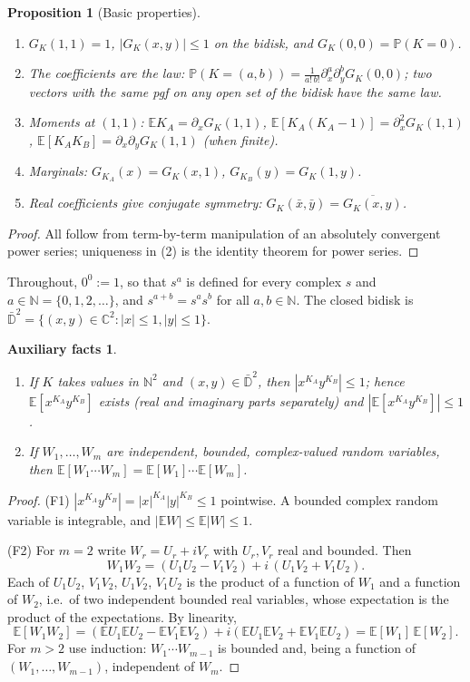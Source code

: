 \documentclass[11pt]{article}
\newtheorem{proposition}[theorem]{Proposition}
\newtheorem*{auxfacts}{Auxiliary facts}
\theoremstyle{definition}
\theoremstyle{remark}
\newcommand{\E}{\mathbb{E}}
\newcommand{\Prob}{\mathbb{P}}
\begin{document}
\begin{proposition}[Basic properties]\label{prop:pgfbasic}
\begin{enumerate}
\item $G_K(1,1)=1$, $|G_K(x,y)|\le1$ on the bidisk, and $G_K(0,0)=\Prob(K=0)$.
\item The coefficients are the law: $\Prob(K=(a,b))=\frac{1}{a!\,b!}\partial_x^a\partial_y^bG_K(0,0)$; two vectors with the same pgf on any open set of the bidisk have the same law.
\item Moments at $(1,1)$: $\E K_A=\partial_xG_K(1,1)$, $\E[K_A(K_A-1)]=\partial_x^2G_K(1,1)$, $\E[K_AK_B]=\partial_x\partial_yG_K(1,1)$ (when finite).
\item Marginals: $G_{K_A}(x)=G_K(x,1)$, $G_{K_B}(y)=G_K(1,y)$.
\item Real coefficients give conjugate symmetry: $G_K(\bar x,\bar y)=\overline{G_K(x,y)}$.
\end{enumerate}
\end{proposition}
\begin{proof}
All follow from term-by-term manipulation of an absolutely convergent power series; uniqueness in (2) is the identity theorem for power series.
\end{proof}

Throughout, $0^0:=1$, so that $s^a$ is defined for every complex $s$ and $a\in\mathbb N=\{0,1,2,\dots\}$, and $s^{a+b}=s^as^b$ for all $a,b\in\mathbb N$. The closed bidisk is $\bar{\mathbb D}^2=\{(x,y)\in\mathbb C^2:|x|\le1,|y|\le1\}$.

\begin{auxfacts}
\begin{enumerate}
\item[(F1)] If $K$ takes values in $\mathbb N^2$ and $(x,y)\in\bar{\mathbb D}^2$, then $|x^{K_A}y^{K_B}|\le1$; hence $\E[x^{K_A}y^{K_B}]$ exists (real and imaginary parts separately) and $|\E[x^{K_A}y^{K_B}]|\le1$.
\item[(F2)] If $W_1,\dots,W_m$ are independent, bounded, complex-valued random variables, then $\E[W_1\cdots W_m]=\E[W_1]\cdots\E[W_m]$.
\end{enumerate}
\end{auxfacts}
\begin{proof}
(F1) $|x^{K_A}y^{K_B}|=|x|^{K_A}|y|^{K_B}\le1$ pointwise. A bounded complex random variable is integrable, and $|\E W|\le\E|W|\le1$.

(F2) For $m=2$ write $W_r=U_r+iV_r$ with $U_r,V_r$ real and bounded. Then
\[
W_1W_2=(U_1U_2-V_1V_2)+i\,(U_1V_2+V_1U_2).
\]
Each of $U_1U_2$, $V_1V_2$, $U_1V_2$, $V_1U_2$ is the product of a function of $W_1$ and a function of $W_2$, i.e.\ of two independent bounded real variables, whose expectation is the product of the expectations. By linearity,
\[
\E[W_1W_2]=(\E U_1\E U_2-\E V_1\E V_2)+i(\E U_1\E V_2+\E V_1\E U_2)=\E[W_1]\,\E[W_2].
\]
For $m>2$ use induction: $W_1\cdots W_{m-1}$ is bounded and, being a function of $(W_1,\dots,W_{m-1})$, independent of $W_m$.
\end{proof}
\end{document}
